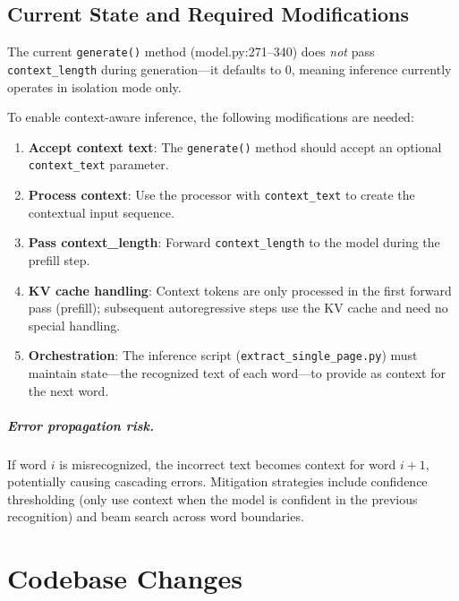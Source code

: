 \documentclass[11pt, a4paper]{report}
\begin{document}
\section{Current State and Required Modifications}
\label{sec:inference-current}

The current \texttt{generate()} method (model.py:271--340) does \emph{not} pass \texttt{context\_length} during generation---it defaults to 0, meaning inference currently operates in isolation mode only.

To enable context-aware inference, the following modifications are needed:
\begin{enumerate}[leftmargin=2em]
  \item \textbf{Accept context text}: The \texttt{generate()} method should accept an optional \texttt{context\_text} parameter.
  \item \textbf{Process context}: Use the processor with \texttt{context\_text} to create the contextual input sequence.
  \item \textbf{Pass context\_length}: Forward \texttt{context\_length} to the model during the prefill step.
  \item \textbf{KV cache handling}: Context tokens are only processed in the first forward pass (prefill); subsequent autoregressive steps use the KV cache and need no special handling.
  \item \textbf{Orchestration}: The inference script (\texttt{extract\_single\_page.py}) must maintain state---the recognized text of each word---to provide as context for the next word.
\end{enumerate}

\paragraph{Error propagation risk.} If word $i$ is misrecognized, the incorrect text becomes context for word $i{+}1$, potentially causing cascading errors. Mitigation strategies include confidence thresholding (only use context when the model is confident in the previous recognition) and beam search across word boundaries.


\chapter{Codebase Changes}
\label{ch:codebase}
\end{document}
